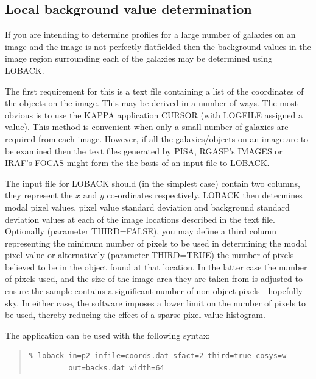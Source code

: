 \documentclass[twoside,11pt]{article}
\newcommand{\xref}[3]{#1}
\newcommand{\xlabel}[1]{}
\newenvironment{myquote}{\begin{quote}\begin{small}}{\end{small}\end{quote}}
\begin{document}
\subsection{Local background value determination}
\xlabel{LOCALBACKGROUNDS}

If you are intending to determine profiles for a large number of 
galaxies on an image and the image is not perfectly flatfielded
then the background values in the image region surrounding
each of the galaxies may be determined using LOBACK.

The first requirement for this is a text file containing a list of the 
coordinates of the objects on the image. This may be derived 
in a number of ways. The most obvious is to use the \xref{KAPPA}{sun95}{} application
CURSOR (with LOGFILE assigned a value). This method is convenient
when only a small number of galaxies are required from each image.
However, if all the galaxies/objects on an image are to be examined then
the text files generated by \xref{PISA}{sun109}{}, RGASP's IMAGES or 
\xref{IRAF}{sun109}{}'s FOCAS might
form the the basis of an input file to LOBACK.

The input file for LOBACK should (in the simplest case) contain two
columns, they represent the $x$ and $y$ co-ordinates respectively.
LOBACK then determines modal pixel values, pixel value standard deviation
and background standard deviation  
values at each of the image locations described in the text file. Optionally
(parameter THIRD=FALSE),
you may define a third column representing the minimum number 
of pixels to be used in determining the modal pixel value or alternatively
(parameter THIRD=TRUE) the number of pixels believed to be in the object found 
at that location. In the latter case the number of pixels used, and the 
size of the image area they are taken from is adjusted to ensure the sample
contains a significant number of non-object pixels - hopefully sky.
In either case, the software imposes a lower limit on the number of pixels 
to be used, thereby reducing the effect of a sparse pixel value histogram.

The application can be used with the following syntax:

\begin{myquote}
\begin{verbatim}
% loback in=p2 infile=coords.dat sfact=2 third=true cosys=w 
         out=backs.dat width=64
\end{verbatim}
\end{myquote}
\end{document}
